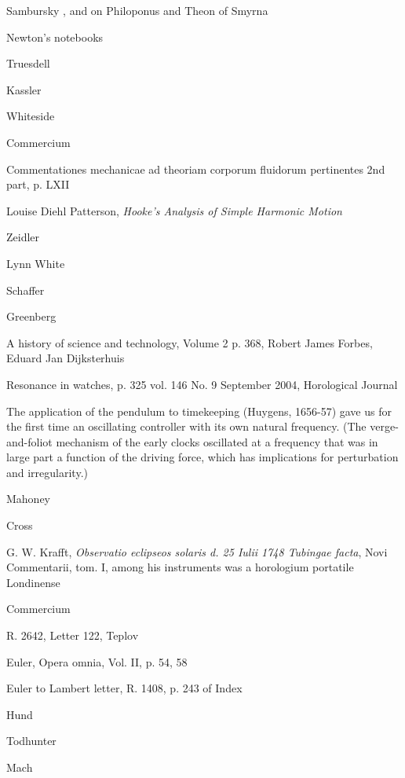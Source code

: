 \documentclass{amsart}
\begin{document}
Sambursky \cite[pp.~9, 41--42]{sambursky1959}, and on Philoponus and
Theon of Smyrna \cite[pp.~100--104]{sambursky1962}

Newton's notebooks \cite[p.~310]{newton}

Truesdell \cite[pp.~22, 170--178]{rational}

Kassler \cite[pp.~53, 57]{kassler}

Whiteside \cite[p.~335]{newtonVI}

Commercium \cite[pp.~54, 58, 304, 305, 695]{commerciumII}

Commentationes mechanicae ad theoriam corporum fluidorum pertinentes 2nd part, p. LXII

Louise Diehl Patterson, {\em Hooke's Analysis of Simple Harmonic Motion}

Zeidler \cite[\S 5.9]{zeidler}

Lynn White \cite[pp.~126--127]{white}

Schaffer \cite[p.~157]{schaffer}

Greenberg \cite[p.~548]{greenberg}

A history of science and technology, Volume 2 p. 368, Robert James Forbes, Eduard Jan Dijksterhuis

Resonance in watches, p. 325 vol. 146 No. 9 September 2004, Horological Journal

The application of the pendulum to timekeeping (Huygens, 1656-57) gave us for the first time an oscillating controller with its own natural frequency. (The verge-and-foliot mechanism of the early clocks oscillated at a frequency that was in large part a function of the driving force, which has implications for perturbation and irregularity.)

Mahoney \cite[p.~303]{mahoney}

Cross \cite[p.~227]{cross}

G. W. Krafft, {\em Observatio eclipseos solaris d. 25 Iulii 1748 Tubingae facta}, Novi Commentarii, tom. I, among his instruments was a horologium portatile Londinense

Commercium \cite[p.~77]{commerciumVI}

R. 2642, Letter 122, Teplov

Euler, Opera omnia, Vol. II, p. 54, 58

Euler to Lambert letter, R. 1408, p. 243 of Index

Hund \cite[p.~170]{hund}

Todhunter \cite[p.~39]{todhunter}

Mach \cite[p.~272]{mach}
\end{document}
